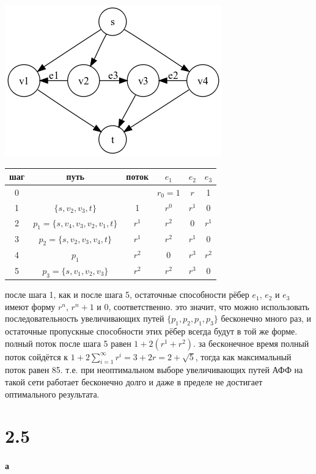 \documentclass[russian]{article}
\begin{document}
\includegraphics[scale=0.5]{dm_4_m2_4}

\begin{tabular}{|c|c|c|c|c|c|}\hline
шаг	& путь & поток & $e_1$	& $e_2$ & $e_3$ \\\hline
0	&&	& $r_0 = 1$ &	$r$ & 1 \\\hline
1	& $\{s,v_2,v_3,t\}$ &	1	&$r^0$ &	$r^1$ &	0 \\\hline
2	& $p_1=\{s,v_4,v_3,v_2,v_1,t\}$	& $r^1$	& $r^2$ &	0 &	$r^1$ \\\hline
3	& $p_2=\{s,v_2,v_3,v_4,t\}$	& $r^1$	& $r^2$&	$r^1$ &	0\\\hline
4	& $p_1$	& $r^2$	& 0	& $r^3$ &	$r^2$\\\hline
5	& $p_3=\{s,v_1,v_2,v_3\}$	& $r^2$	& $r^2$	& $r^3$ &	0\\\hline
\end{tabular}

после шага 1, как и после шага 5, остаточные способности рёбер $e_1$, $e_2$ и $e_3$ имеют форму $r^n$, $r^n + 1$ и $0$, соответственно. это значит, что можно использовать последовательность увеличивающих путей $\{p_1,p_2,p_1,p_3\}$ бесконечно много раз, и остаточные пропускные способности этих рёбер всегда будут в той же форме. полный поток после шага 5 равен $1 + 2(r^1 + r^2)$. за бесконечное время полный поток сойдётся к $1+2\sum_{i=1}^\infty r^i=3+2r=2+\sqrt{5}$, тогда как максимальный поток равен 85. т.е. при неоптимальном выборе увеличивающих путей АФФ на такой сети работает бесконечно долго и даже в пределе не достигает оптимального результата.

\section*{2.5}

\paragraph*{а} 
\end{document}
